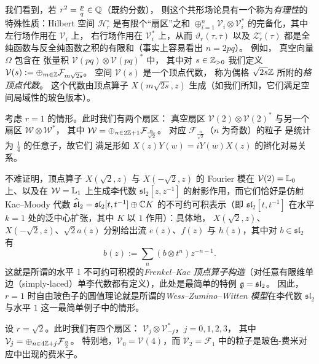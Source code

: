 我们看到，若 $r^2=\frac{p}{q}\in \Bbb Q$（既约分数），
则这个共形场论具有一个称为\emph{有理性}的特殊性质：Hilbert 空间 $\mathcal H_r^\circ$ 是有限个“扇区”之和
$\oplus_{i=1}^n \mathcal V_i\otimes \mathcal V_i^*$ 的完备化，其中
左行场作用在 $\mathcal V_i$ 上，
右行场作用在 $\mathcal V_i^*$ 上，从而
$\vartheta_r(\tau,\overline \tau)$ 以及 $\mathcal Z_r^\circ(\tau)$
都是全纯函数与反全纯函数之积的有限和（事实上容易看出 $n=2pq$）。
例如，
真空向量 $\Omega$ 包含在
张量积 $\mathcal V(pq)\otimes \mathcal V(pq)^*$ 中，
其中对 $s\in \Bbb Z_{>0}$ 我们定义
$\mathcal V(s):=\oplus_{m\in \Bbb Z}\mathcal F_{m\sqrt{2s}}$。
空间 $\mathcal V(s)$ 是一个顶点代数，
称为偶格 $\sqrt{2s}\Bbb Z$ 所附的\emph{格顶点代数}\label{lattice vertex algebra}。
这个代数由顶点算子
$X(m\sqrt{2s},z)$ 生成（如我们所知，它们满足空间局域性的玻色版本）。

\begin{example} 考虑 $r=1$ 的情形。此时我们有两个扇区：
真空扇区 $\mathcal V(2)\otimes \mathcal V(2)^*$
与另一个扇区 $\mathcal W\otimes \mathcal W^*$，
其中 $\mathcal W=\oplus_{n\in 2\Bbb Z+1}\mathcal F_{\frac{n}{\sqrt{2}}}$。
对应 $\mathcal F_{\frac{n}{\sqrt{2}}}$（$n$ 为奇数）的粒子
是统计为 $\frac{1}{4}$ 的任意子，故它们
满足形如 $X(z)Y(w)=iY(w)X(z)$ 的辫化对易关系。

不难证明，顶点算子
$X(\sqrt{2},z)$ 与 $X(-\sqrt{2},z)$ 的 Fourier 模在 $\mathcal V(2)=\Bbb L_0$ 上、以及在 $\mathcal W=\Bbb L_1$ 上生成李代数 $\mathfrak{sl}_2[z,z^{-1}]$ 的射影作用，而它们恰好是仿射 Kac--Moody 代数 $\widehat{\mathfrak{sl}}_2=\mathfrak{sl}_2[t,t^{-1}]\oplus \Bbb CK$ 的不可约可积表示（即 $\mathfrak{sl}_2[t,t^{-1}]$ 在水平 $k=1$ 处的泛中心扩张，其中 $K$ 以 $1$ 作用）：具体地，
$X(\sqrt{2},z)$、$X(-\sqrt{2},z)$、$\sqrt{2} a(z)$ 分别给出流 $e(z)$、$f(z)$ 与 $h(z)$，其中对 $b\in {\mathfrak{sl}}_2$ 有
$$
b(z):=\sum_n (b\otimes t^n)z^{-n-1}.
$$
这就是所谓的水平 1 不可约可积模的\emph{Frenkel--Kac 顶点算子构造}\label{Frenkel-Kac vertex operator construction}（对任意有限维单边（simply-laced）单李代数都有定义），此处是最简单的特例 $\g=\mathfrak{sl}_2$。
因此，$r=1$ 时自由玻色子的圆值理论就是所谓的\emph{Wess--Zumino--Witten 模型}在李代数 $\mathfrak{sl}_2$ 与水平 $1$ 这一最简单例子中的情形。
\end{example} 

\begin{example} 设 $r=\sqrt{2}$。此时我们有四个扇区：
$\mathcal V_j\otimes \mathcal V_{-j}^*$，$j=0,1,2,3$，
其中 $\mathcal V_j=\oplus_{n\in 4\Bbb Z+j}\mathcal F_{\frac{n}{2}}$。
特别地，$\mathcal V_0=\mathcal V(4)$，而
$\mathcal V_2=\mathcal F_1$ 中的粒子是玻色-费米对应中出现的费米子。
\end{example} 


